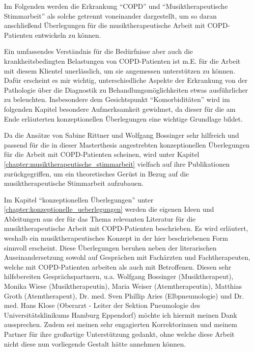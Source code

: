 Im Folgenden werden die Erkrankung "`COPD"' und "`Musiktherapeutische Stimmarbeit"' als solche getrennt voneinander dargestellt, um so daran anschließend Überlegungen für die musiktherapeutische Arbeit mit COPD-Patienten entwickeln zu können.

Ein umfassendes Verständnis für die Bedürfnisse aber auch die krankheitsbedingten Belastungen von COPD-Patienten ist m.E. für die Arbeit mit diesem Klientel unerlässlich, um sie angemessen unterstützen zu können. Dafür erscheint es mir wichtig, unterschiedliche Aspekte der Erkrankung von der Pathologie über die Diagnostik zu Behandlungsmöglichkeiten etwas ausführlicher zu beleuchten. Insbesondere dem Gesichtspunkt "`Komorbiditäten"' wird im folgenden Kapitel besondere Aufmerksamkeit gewidmet, da dieser für die am Ende erläuterten konzeptionellen Überlegungen eine wichtige Grundlage bildet.

Da die Ansätze von Sabine Rittner und Wolfgang Bossinger sehr hilfreich und passend für die in dieser Masterthesis angestrebten konzeptionellen Überlegungen für die Arbeit mit COPD-Patienten scheinen, wird unter Kapitel  \ref{chapter:musiktherapeutische_stimmarbeit} vielfach auf ihre Publikationen zurückgegriffen, um ein theoretisches Gerüst in Bezug auf die musiktherapeutische Stimmarbeit aufzubauen.

Im Kapitel "`konzeptionellen Überlegungen"' unter \ref{chapter:konzeptionelle_ueberlegungen} werden die eigenen Ideen und Ableitungen aus der für das Thema relevanten Literatur für die musiktherapeutische Arbeit mit COPD-Patienten beschrieben. Es wird erläutert, weshalb ein musiktherapeutisches Konzept in der hier beschriebenen Form sinnvoll erscheint. Diese Überlegungen beruhen neben der literarischen Auseinandersetzung sowohl auf Gesprächen mit Fachärzten und Fachtherapeuten, welche mit COPD-Patienten arbeiten als auch mit Betroffenen. Diesen sehr hilfsbereiten Gesprächspartnern, u.a. Wolfgang Bossinger (Musiktherapeut), Monika Wiese (Musiktherapeutin), Maria Weiser (Atemtherapeutin), Matthias Groth (Atemtherapeut), Dr. med. Sven Phillip Aries (Elbpneumologie) und Dr. med. Hans Klose (Oberarzt - Leiter der Sektion Pneumologie des Universitätsklinikums Hamburg Eppendorf) möchte ich hiermit meinen Dank aussprechen. Zudem sei meinen sehr engagierten Korrektorinnen und meinem Partner für ihre großartige Unterstützung gedankt, ohne welche diese Arbeit nicht diese nun vorliegende Gestalt hätte annehmen können.

\newpage\thispagestyle{empty}